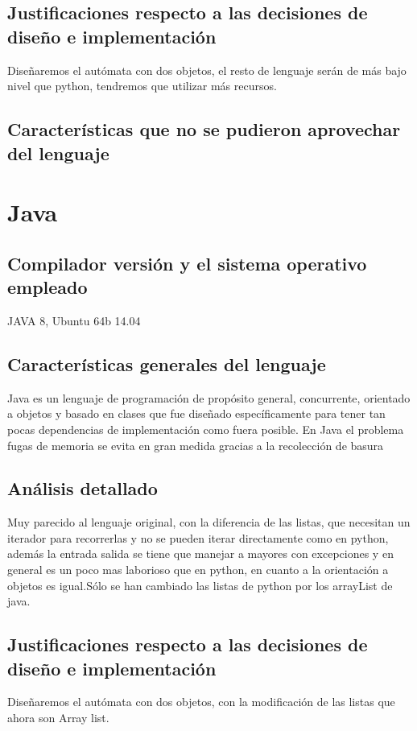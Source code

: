 \documentclass[]{scrartcl}
\begin{document}
  \subsection{Justificaciones respecto a las decisiones de diseño e implementaci\'on}
  Diseñaremos el aut\'omata con dos objetos, el resto de lenguaje ser\'an de m\'as bajo nivel que python, tendremos que utilizar m\'as recursos.
  
   \subsection{Caracter\'isticas que no se pudieron aprovechar del lenguaje}
  \section{Java}
   \subsection{Compilador versi\'on y el sistema operativo empleado}
   JAVA 8, Ubuntu 64b 14.04
    \subsection{Caracter\'isticas generales del lenguaje}
    Java es un lenguaje de programaci\'on de prop\'osito general, concurrente, orientado a objetos y basado en clases que fue diseñado espec\'ificamente para tener tan pocas dependencias de implementaci\'on como fuera posible.
    En Java el problema fugas de memoria se evita en gran medida gracias a la recolecci\'on de basura
    \subsection{An\'alisis detallado}
    Muy parecido al lenguaje original, con la diferencia de las listas, que necesitan un iterador para recorrerlas y no se pueden iterar
    directamente como en python, adem\'as la entrada salida se tiene que manejar a mayores con excepciones y en general es un poco mas laborioso que
    en python, en cuanto a la orientaci\'on a objetos es igual.S\'olo se han cambiado las listas de python por los arrayList de java.
    \subsection{Justificaciones respecto a las decisiones de diseño e implementaci\'on}
    Diseñaremos el aut\'omata con dos objetos, con la modificaci\'on de las listas que ahora son Array list.
\end{document}
